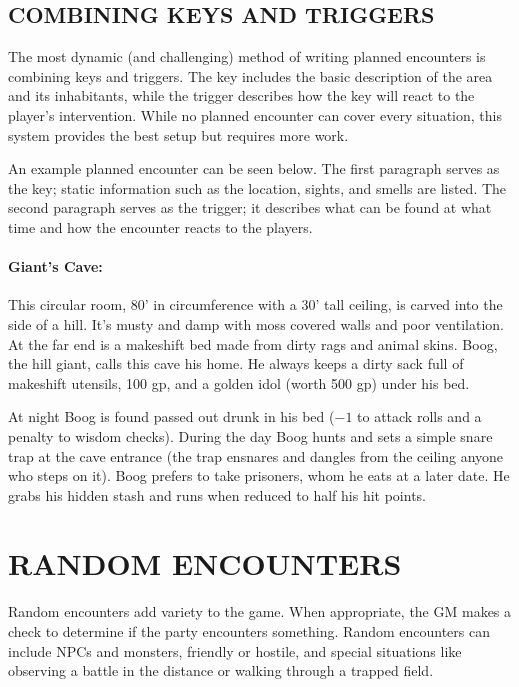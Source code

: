 \begin{multicols}{2}
\subsection{COMBINING KEYS AND TRIGGERS}

The most dynamic (and challenging) method of writing planned encounters is combining keys and triggers.  The key includes the basic description of the area and its inhabitants, while the trigger describes how the key will react to the player's intervention.  While no planned encounter can cover every situation, this system provides the best setup but requires more work.  

An example planned encounter can be seen below.  The first paragraph serves as the key; static information such as the location, sights, and smells are listed.  The second paragraph serves as the trigger; it describes what can be found at what time and how the encounter reacts to the players.

\paragraph{Giant's Cave:} This circular room, 80' in circumference with a 30' tall ceiling, is carved into the side of a hill.  It's musty and damp with moss covered walls and poor ventilation.  At the far end is a makeshift bed made from dirty rags and animal skins.  Boog, the hill giant, calls this cave his home.  He always keeps a dirty sack full of makeshift utensils, 100 gp, and a golden idol (worth 500 gp) under his bed.

At night Boog is found passed out drunk in his bed ($-1$ to attack rolls and a penalty to wisdom checks).  During the day Boog hunts and sets a simple snare trap at the cave entrance (the trap ensnares and dangles from the ceiling anyone who steps on it).  Boog prefers to take prisoners, whom he eats at a later date.  He grabs his hidden stash and runs when reduced to half his hit points.  

\section{RANDOM ENCOUNTERS}

Random encounters add variety to the game.  When appropriate, the GM makes a check to determine if the party encounters something.  Random encounters can include NPCs and monsters, friendly or hostile, and special situations like observing a battle in the distance or walking through a trapped field.  


\end{multicols}
